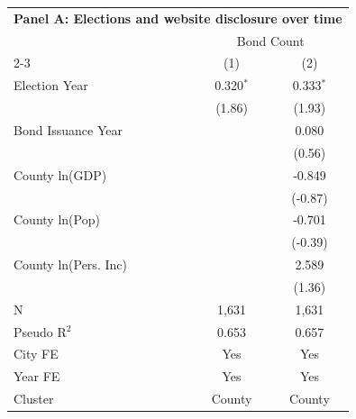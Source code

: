 \begingroup
\centering
\begin{tabular*}{\textwidth}{@{\extracolsep{\fill}}lcc}
\multicolumn{3}{l}{\textbf{Panel A: Elections and website disclosure over time}}\\

\addlinespace
   \toprule
    & \multicolumn{2}{c}{Bond Count}\\
   \cmidrule(lr){2-3}
                        & (1)         & (2)\\  
   \midrule 
   Election Year        & 0.320$^{*}$ & 0.333$^{*}$\\   
                        & (1.86)     & (1.93)\\   
   Bond Issuance Year   &             & 0.080\\   
                        &             & (0.56)\\   
   County ln(GDP)       &             & -0.849\\   
                        &             & (-0.87)\\   
   County ln(Pop)       &             & -0.701\\   
                        &             & (-0.39)\\   
   County ln(Pers. Inc) &             & 2.589\\   
                        &             & (1.36)\\   
   \hline
   N         & 1,631       & 1,631\\  
   Pseudo R$^2$         & 0.653       & 0.657\\  
   City FE              & Yes         & Yes\\  
   Year FE              & Yes         & Yes\\  
   Cluster              & County & County\\  
   \bottomrule
\end{tabular*}
\par\endgroup
